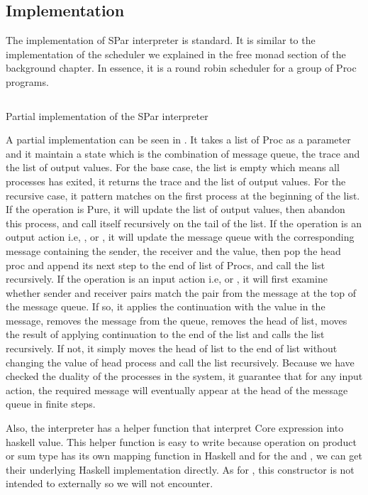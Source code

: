\subsection{Implementation}
The implementation of SPar interpreter is standard. It is similar to the implementation of the scheduler we explained in the free monad section of the background chapter. In essence, it is a round robin scheduler for a group of Proc programs. 
\begin{listing}[ht]
\inputminted{Haskell}{impl/interp.hs}
\caption{Partial implementation of the SPar interpreter}
\label{impl:code:interp}
\end{listing}
A partial implementation can be seen in . It takes a list of Proc as a parameter and it maintain a state which is the combination of message queue, the trace and the list of output values. For the base case, the list is empty which means all processes has exited, it returns the trace and the list of output values. For the recursive case, it pattern matches on the first process at the beginning of the list. If the operation is Pure, it will update the list of output values, then abandon this process, and call itself recursively on the tail of the list. If the operation is an output action i.e, ,  or , it will update the message queue with the corresponding message containing the sender, the receiver and the value, then pop the head proc and append its next step to the end of list of Procs, and call the list recursively. If the operation is an input action i.e,  or , it will first examine whether sender and receiver pairs match the pair from the message at the top of the message queue. If so, it applies the continuation with the value in the message, removes the message from the queue, removes the head of list, moves the result of applying continuation to the end of the list and calls the list recursively. If not, it simply moves the head of list to the end of list without changing the value of head process and call the list recursively. Because we have checked the duality of the processes in the system, it guarantee that for any input action, the required message will eventually appear at the head of the message queue in finite steps.

Also, the interpreter has a helper function that interpret Core expression into haskell value. This helper function is easy to write because operation on product or sum type has its own mapping function in Haskell and for the  and , we can get their underlying Haskell implementation directly. As for , this constructor is not intended to externally so we will not encounter.